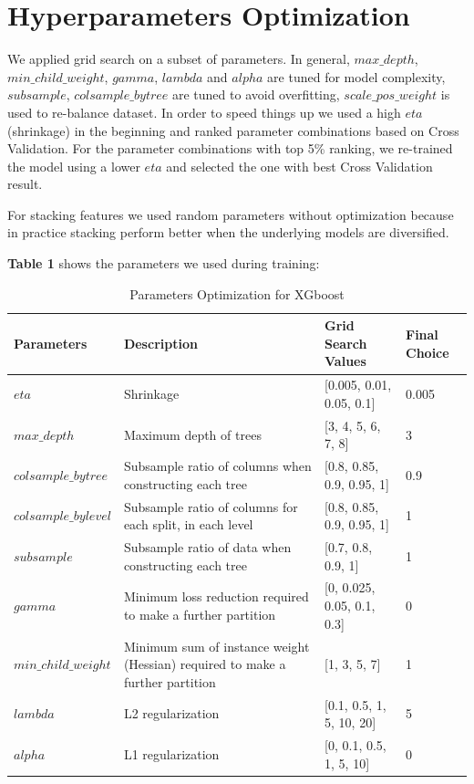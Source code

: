 \documentclass[a4paper]{llncs}
\begin{document}

\section{Hyperparameters Optimization}
We applied grid search on a subset of parameters. In general, $max\_depth$, $min\_child\_weight$, $gamma$, $lambda$ and $alpha$ are tuned for model complexity,
 $subsample$, $colsample\_bytree$ are tuned to avoid overfitting, $scale\_pos\_weight$ is used to re-balance dataset.
 In order to speed things up we used a high $eta$ (shrinkage) in the beginning and ranked parameter combinations based on Cross Validation.
 For the parameter combinations with top 5\% ranking, we re-trained the model using a lower $eta$ and selected the one with best Cross Validation result.

For stacking features we used random parameters without optimization
 because in practice stacking perform better when the underlying models are diversified.

\textbf{Table 1} shows the parameters we used during training:

\begin{table}[h!]
  \centering
  \caption{Parameters Optimization for XGboost}
  \label{tab:table1}
  \begin{tabular}{p{3cm}p{4.5cm}p{4cm}p{1cm}}
    \toprule
    Parameters & Description & Grid Search Values & Final Choice \\
    \midrule
    $eta$ & Shrinkage & [0.005, 0.01, 0.05, 0.1] & 0.005 \\
    $max\_depth$ & Maximum depth of trees & [3, 4, 5, 6, 7, 8] & 3 \\
    $colsample\_bytree$ & Subsample ratio of columns when constructing each tree & [0.8, 0.85, 0.9, 0.95, 1] & 0.9 \\
    $colsample\_bylevel$ & Subsample ratio of columns for each split, in each level & [0.8, 0.85, 0.9, 0.95, 1] & 1 \\
    $subsample$ & Subsample ratio of data when constructing each tree & [0.7, 0.8, 0.9, 1] & 1 \\
    $gamma$ & Minimum loss reduction required to make a further partition & [0, 0.025, 0.05, 0.1, 0.3] & 0 \\
    $min\_child\_weight$ & Minimum sum of instance weight (Hessian) required to make a further partition & [1, 3, 5, 7] & 1 \\
    $lambda$ & L2 regularization & [0.1, 0.5, 1, 5, 10, 20] & 5 \\
    $alpha$ & L1 regularization & [0, 0.1, 0.5, 1, 5, 10] & 0 \\
    \bottomrule
  \end{tabular}
\end{table}
\end{document}

